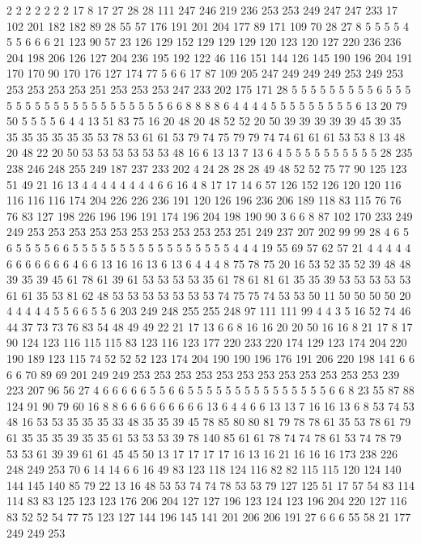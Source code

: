 2 2 2 2 2 2 2 17 8 17 27 28 28 111 247 246 219 236 253 253
249 247 247 233 17 102 201 182 182 89 28 55 57 176 191 201 204 177 89 171
109 70 28 27 8 5 5 5 5 4 5 5 6 6 6 21 123 90 57 23
126 129 152 129 129 129 120 123 120 127 220 236 236 204 198 206 126 127 204 236
195 192 122 46 116 151 144 126 145 190 196 204 191 170 170 90 170 176 127 174
77 5 6 6 17 87 109 205 247 249 249 249 253 249 253 253 253 253 253 251
253 253 253 247 233 202 175 171 28 5 5 5 5 5 5 5 5 5 6 5
5 5 5 5 5 5 5 5 5 5 5 5 5 5 5 5 5 5 5 6
6 8 8 8 8 6 4 4 4 4 5 5 5 5 5 5 5 5 5 6
13 20 79 50 5 5 5 5 6 4 4 13 51 83 75 16 20 48 20 48
52 52 20 50 39 39 39 39 39 45 39 35 35 35 35 35 35 35 53 78
53 61 61 53 79 74 75 79 79 74 74 61 61 61 53 53 8 13 48 20
48 22 20 50 53 53 53 53 53 53 48 16 6 13 13 7 13 6 4 5
5 5 5 5 5 5 5 5 5 28 235 238 246 248 255 249 187 237 233 202
4 24 28 28 28 49 48 52 52 75 77 90 125 123 51 49 21 16 13 4
4 4 4 4 4 4 4 6 6 16 4 8 17 17 14 6 57 126 152 126
120 120 116 116 116 116 174 204 226 226 236 191 120 126 196 236 206 189 118 83
115 76 76 76 83 127 198 226 196 196 191 174 196 204 198 190 90 3 6 6
8 87 102 170 233 249 249 253 253 253 253 253 253 253 253 253 253 251 249 237
207 202 99 99 28 4 6 5 6 5 5 5 5 6 6 5 5 5 5 5
5 5 5 5 5 5 5 5 5 5 5 5 4 4 4 19 55 69 57 62
57 21 4 4 4 4 4 6 6 6 6 6 6 6 4 6 6 13 16 16
13 6 13 6 4 4 4 8 75 78 75 20 16 53 52 35 52 39 48 48
39 35 39 45 61 78 61 39 61 53 53 53 53 35 61 78 61 81 61 35
35 39 53 53 53 53 53 61 61 35 53 81 62 48 53 53 53 53 53 53
53 74 75 75 74 53 53 50 11 50 50 50 50 20 4 4 4 4 4 5
5 6 6 5 5 6 203 249 248 255 255 248 97 111 111 99 4 4 3 5
16 52 74 46 44 37 73 73 76 83 54 48 49 49 22 21 17 13 6 6
8 16 16 20 20 50 16 16 8 21 17 8 17 90 124 123 116 115 115 83
123 116 123 177 220 233 220 174 129 123 174 204 220 190 189 123 115 74 52 52
52 123 174 204 190 190 196 176 191 206 220 198 141 6 6 6 6 70 89 69
201 249 249 253 253 253 253 253 253 253 253 253 253 253 253 239 223 207 96 56
27 4 6 6 6 6 6 5 5 6 6 5 5 5 5 5 5 5 5 5
5 5 5 5 5 5 6 6 8 23 55 87 88 124 91 90 79 60 16 8
8 6 6 6 6 6 6 6 6 6 13 6 4 4 6 6 13 13 7 16
16 13 6 8 53 74 53 48 16 53 53 35 35 35 33 48 35 35 39 45
78 85 80 80 81 79 78 78 61 35 53 78 61 79 61 35 35 35 39 35
35 61 53 53 53 39 78 140 85 61 61 78 74 74 78 61 53 74 78 79
53 53 61 39 39 61 61 45 45 50 13 17 17 17 17 16 13 16 21 16
16 16 173 238 226 248 249 253 70 6 14 14 6 6 16 49 83 123 118 124
116 82 82 115 115 120 124 140 144 145 140 85 79 22 13 16 48 53 53 74
74 78 53 53 79 127 125 51 17 57 54 83 114 114 83 83 125 123 123 176
206 204 127 127 196 123 124 123 196 204 220 127 116 83 52 52 54 77 75 123
127 144 196 145 141 201 206 206 191 27 6 6 6 55 58 21 177 249 249 253
